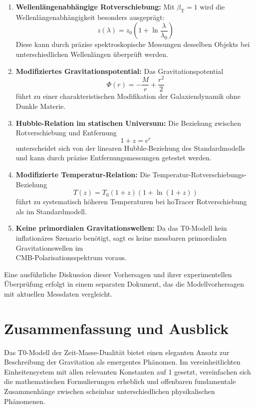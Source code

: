 \documentclass[12pt,a4paper]{article}
\newcommand{\betaT}{\beta_{\text{T}}}
\begin{document}
	\begin{enumerate}
		\item \textbf{Wellenlängenabhängige Rotverschiebung:} Mit \(\betaT = 1\) wird die Wellenlängenabhängigkeit besonders ausgeprägt:
		\begin{equation}
			z(\lambda) = z_0 \left(1 + \ln \frac{\lambda}{\lambda_0}\right)
		\end{equation}
		Diese kann durch präzise spektroskopische Messungen desselben Objekts bei unterschiedlichen Wellenlängen überprüft werden.
		
		\item \textbf{Modifiziertes Gravitationspotential:} Das Gravitationspotential 
		\begin{equation}
			\Phi(r) = -\frac{M}{r} + \frac{r^2}{2}
		\end{equation}
		führt zu einer charakteristischen Modifikation der Galaxiendynamik ohne Dunkle Materie.
		
		\item \textbf{Hubble-Relation im statischen Universum:} Die Beziehung zwischen Rotverschiebung und Entfernung
		\begin{equation}
			1 + z = e^{r}
		\end{equation}
		unterscheidet sich von der linearen Hubble-Beziehung des Standardmodells und kann durch präzise Entfernungsmessungen getestet werden.
		
		\item \textbf{Modifizierte Temperatur-Relation:} Die Temperatur-Rotverschiebungs-Beziehung
		\begin{equation}
			T(z) = T_0 (1+z)(1 + \ln(1+z))
		\end{equation}
		führt zu systematisch höheren Temperaturen bei hoTracer Rotverschiebung als im Standardmodell.
		
		\item \textbf{Keine primordialen Gravitationswellen:} Da das T0-Modell kein inflationäres Szenario benötigt, sagt es keine messbaren primordialen Gravitationswellen im \\CMB-Polarisationsspektrum voraus.
	\end{enumerate}
	
	Eine ausführliche Diskussion dieser Vorhersagen und ihrer experimentellen Überprüfung erfolgt in einem separaten Dokument, das die Modellvorhersagen mit aktuellen Messdaten vergleicht.
	
	\section{Zusammenfassung und Ausblick}
	Das T0-Modell der Zeit-Masse-Dualität bietet einen eleganten Ansatz zur Beschreibung der Gravitation als emergentes Phänomen. Im vereinheitlichten Einheitensystem mit allen relevanten Konstanten auf 1 gesetzt, vereinfachen sich die mathematischen Formulierungen erheblich und offenbaren fundamentale Zusammenhänge zwischen scheinbar unterschiedlichen physikalischen Phänomenen.
	
\end{document}
